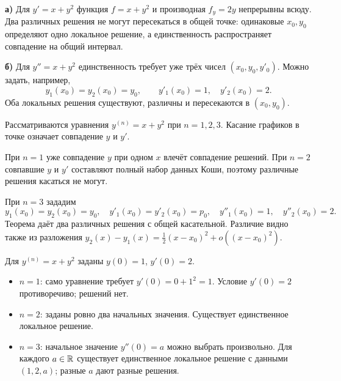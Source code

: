 \textbf{а)} Для $y'=x+y^2$ функция $f=x+y^2$ и производная $f_y=2y$
непрерывны всюду. Два различных решения не могут пересекаться в общей
точке: одинаковые $x_0,y_0$ определяют одно локальное решение,
а единственность распространяет совпадение на общий интервал.

\textbf{б)} Для $y''=x+y^2$ единственность требует уже трёх чисел
$(x_0,y_0,y'_0)$. Можно задать, например,
\[
 y_1(x_0)=y_2(x_0)=y_0,\qquad y'_1(x_0)=1,\quad y'_2(x_0)=2.
\]
Оба локальных решения существуют, различны и пересекаются в $(x_0,y_0)$.

Рассматриваются уравнения $y^{(n)}=x+y^2$ при $n=1,2,3$.
Касание графиков в точке означает совпадение $y$ и $y'$.

При $n=1$ уже совпадение $y$ при одном $x$ влечёт совпадение решений.
При $n=2$ совпавшие $y$ и $y'$ составляют полный набор данных Коши,
поэтому различные решения касаться не могут.

При $n=3$ зададим
\[
 y_1(x_0)=y_2(x_0)=y_0,\quad y'_1(x_0)=y'_2(x_0)=p_0,
 \quad y''_1(x_0)=1,\quad y''_2(x_0)=2.
\]
Теорема даёт два различных решения с общей касательной.
Различие видно также из разложения
$y_2(x)-y_1(x)=\tfrac12(x-x_0)^2+o((x-x_0)^2)$.

Для $y^{(n)}=x+y^2$ заданы $y(0)=1$, $y'(0)=2$.
\begin{itemize}
\item $n=1$: само уравнение требует $y'(0)=0+1^2=1$.
Условие $y'(0)=2$ противоречиво; решений нет.
\item $n=2$: заданы ровно два начальных значения. Существует
единственное локальное решение.
\item $n=3$: начальное значение $y''(0)=a$ можно выбрать произвольно.
Для каждого $a\in\mathbb{R}$ существует единственное локальное решение
с данными $(1,2,a)$; разные $a$ дают разные решения.
\end{itemize}

